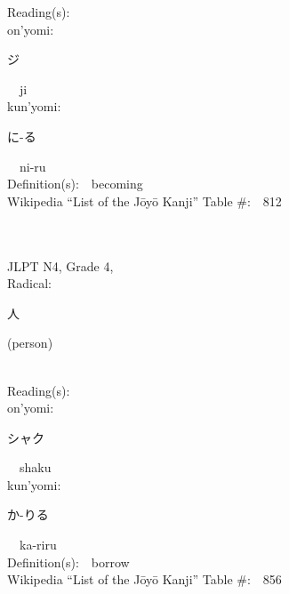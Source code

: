 \begin{multicols}{2}
Reading(s):\ \ \\
{\hspace*{1em}}on'yomi:\ \ \\
{\hspace*{2em}}{\begin{CJK}{UTF8}{min} ジ \end{CJK}}\ \ ji\ \ \\
{\hspace*{1em}}kun'yomi:\ \ \\
{\hspace*{2em}}{\begin{CJK}{UTF8}{min} に-る \end{CJK}}\ \ ni-ru\ \ \\
Definition(s):\ \ becoming \\
Wikipedia ``List of the J\=oy\=o Kanji'' Table \#:\ \ 812 \\
\ \ \\
{\fontsize{34pt}{40pt}  }\ \ \\  %
{JLPT N4, Grade 4, \\Radical:\ \ {\begin{CJK}{UTF8}{min} 人 \end{CJK}} (person) } \\
Reading(s):\ \ \\
{\hspace*{1em}}on'yomi:\ \ \\
{\hspace*{2em}}{\begin{CJK}{UTF8}{min} シャク \end{CJK}}\ \ shaku\ \ \\
{\hspace*{1em}}kun'yomi:\ \ \\
{\hspace*{2em}}{\begin{CJK}{UTF8}{min} か-りる \end{CJK}}\ \ ka-riru\ \ \\
Definition(s):\ \ borrow \\
Wikipedia ``List of the J\=oy\=o Kanji'' Table \#:\ \ 856 \\
\ \ \\
{\fontsize{34pt}{40pt}  }\ \ \\  %

\end{multicols}
